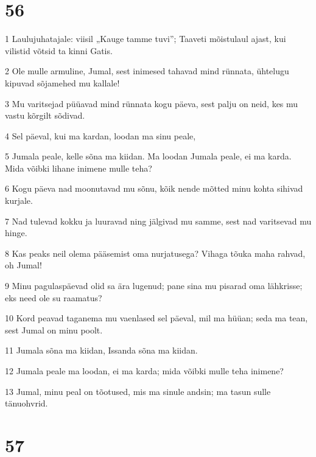 \chapter{56}

\par 1 Laulujuhatajale: viisil „Kauge tamme tuvi”; Taaveti mõistulaul ajast, kui vilistid võtsid ta kinni Gatis.
\par 2 Ole mulle armuline, Jumal, sest inimesed tahavad mind rünnata, ühtelugu kipuvad sõjamehed mu kallale!
\par 3 Mu varitsejad püüavad mind rünnata kogu päeva, sest palju on neid, kes mu vastu kõrgilt sõdivad.
\par 4 Sel päeval, kui ma kardan, loodan ma sinu peale,
\par 5 Jumala peale, kelle sõna ma kiidan. Ma loodan Jumala peale, ei ma karda. Mida võibki lihane inimene mulle teha?
\par 6 Kogu päeva nad moonutavad mu sõnu, kõik nende mõtted minu kohta sihivad kurjale.
\par 7 Nad tulevad kokku ja luuravad ning jälgivad mu samme, sest nad varitsevad mu hinge.
\par 8 Kas peaks neil olema pääsemist oma nurjatusega? Vihaga tõuka maha rahvad, oh Jumal!
\par 9 Minu pagulaspäevad olid sa ära lugenud; pane sina mu pisarad oma lähkrisse; eks need ole su raamatus?
\par 10 Kord peavad taganema mu vaenlased sel päeval, mil ma hüüan; seda ma tean, sest Jumal on minu poolt.
\par 11 Jumala sõna ma kiidan, Issanda sõna ma kiidan.
\par 12 Jumala peale ma loodan, ei ma karda; mida võibki mulle teha inimene?
\par 13 Jumal, minu peal on tõotused, mis ma sinule andsin; ma tasun sulle tänuohvrid.

\chapter{57}

